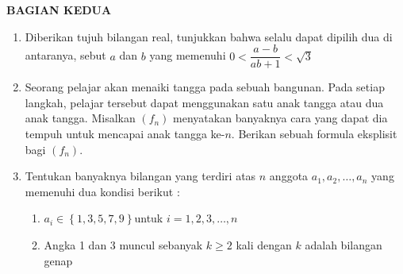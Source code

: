 \documentclass[12pt,twoside]{article}
\begin{document}
\newpage \textbf{BAGIAN KEDUA}
\begin{enumerate}
	\item Diberikan tujuh bilangan real, tunjukkan bahwa selalu dapat dipilih dua di antaranya,
	      sebut $a$ dan $b$ yang memenuhi $0 < \dfrac{a-b}{ab+1} < \sqrt{3}$

	\item Seorang pelajar akan menaiki tangga pada sebuah bangunan. Pada setiap langkah,
	      pelajar tersebut dapat menggunakan satu anak tangga atau dua anak tangga. Misalkan
	      $(f_n)$ menyatakan banyaknya cara yang dapat dia tempuh untuk mencapai anak tangga
	      ke-$n$. Berikan sebuah formula eksplisit bagi $(f_n)$.

	\item Tentukan banyaknya bilangan yang terdiri atas $n$ anggota $a_1,a_2,\dots,a_n$ yang memenuhi
	      dua kondisi berikut :
	      \begin{enumerate}
		      \item[(a)] $a_i \in \left\lbrace 1,3,5,7,9 \right\rbrace $untuk $i = 1,2,3,\dots,n$
		      \item[(b)] Angka 1 dan 3 muncul sebanyak $k \geq 2$ kali dengan $k$ adalah bilangan genap
	      \end{enumerate}
\end{enumerate}
\pagebreak
\end{document}
